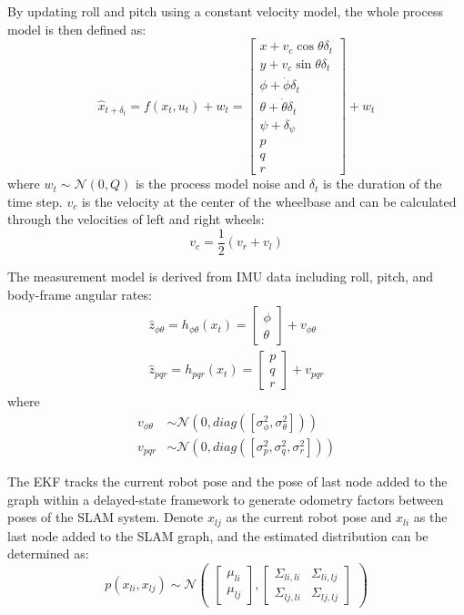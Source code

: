 \documentclass[letterpaper, 10 pt, conference]{ieeeconf}  %
\begin{document}
By updating roll and pitch using a constant velocity model, the whole process model is then defined as:
\begin{equation}
\hat{x}_{t+\delta_t}
=
f(x_t,u_t)+w_t
=
\begin{bmatrix}
x+{v_c}{\cos{\theta}\delta_t}\\
y+{v_c}{\sin{\theta}\delta_t}\\
\phi+\dot{\phi}\delta_t\\
\theta+\dot{\theta}\delta_t\\
\psi+\delta_{\psi}\\
p\\q\\r
\end{bmatrix}+w_t
\end{equation}
where ${w_t} \sim \mathcal{N}(0,Q)$ is the process model noise and $\delta_t$ is the duration of the time step. $v_c$ is the velocity at the center of the wheelbase and can be calculated through the velocities of left and right wheels:
\begin{equation}
    v_c=\frac{1}{2}(v_r+v_l)
\end{equation}

The measurement model is derived from IMU data including roll, pitch, and body-frame angular rates:
\begin{align}
\hat{z}_{\phi\theta}=h_{\phi\theta}(x_t)
=\begin{bmatrix} \phi\\\theta\end{bmatrix}+v_{\phi\theta}\\
\hat{z}_{pqr}=h_{pqr}(x_t)
=\begin{bmatrix} p\\q\\r\end{bmatrix}+v_{pqr}
\end{align}
where 
\begin{align}
v_{\phi\theta}&\sim\mathcal{N}(0, diag([{\sigma^2_{\phi}}, {\sigma^2_{\theta}}]))\\
v_{pqr}&\sim\mathcal{N}(0, diag([{\sigma^2_p, \sigma^2_q, \sigma^2_r}]))
\end{align}

The EKF tracks the current robot pose and the pose of last node added to the graph within a delayed-state framework \cite{delayed-state framework} to generate odometry factors between poses of the SLAM system. Denote $x_{lj}$ as the current robot pose and $x_{li}$ as the last node added to the SLAM graph, and the estimated distribution can be determined as:
\begin{equation}
    p(x_{li},x_{lj})\sim\mathcal{N}\begin{pmatrix}
    \begin{bmatrix} \mu_{li}\\\mu_{lj}\end{bmatrix},
    \begin{bmatrix} \Sigma_{li,li} & \Sigma_{li,lj}\\\Sigma_{lj, li} & \Sigma_{lj,lj}\end{bmatrix}
    \end{pmatrix}
\end{equation}
\end{document}
